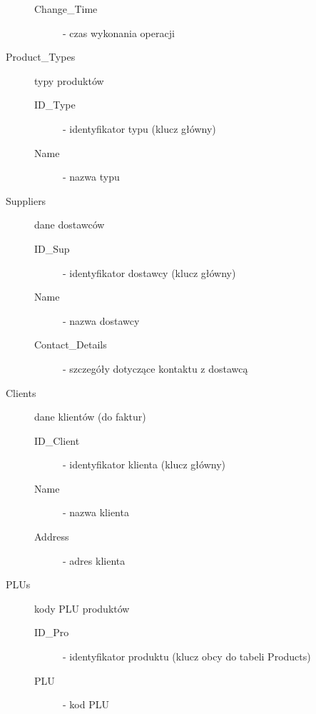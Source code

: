 \begin{description}
\begin{description}
    \item[Change\_Time] - czas wykonania operacji
    \end{description}
\item[Product\_Types] typy produktów
    \begin{description}
    \item[ID\_Type] - identyfikator typu (klucz główny)
    \item[Name] - nazwa typu
    \end{description}
\item[Suppliers] dane dostawców
    \begin{description}
    \item[ID\_Sup] - identyfikator dostawcy (klucz główny)
    \item[Name] - nazwa dostawcy
    \item[Contact\_Details] - szczegóły dotyczące kontaktu z dostawcą
    \end{description}
\item[Clients] dane klientów (do faktur)
    \begin{description}
    \item[ID\_Client] - identyfikator klienta (klucz główny)
    \item[Name] - nazwa klienta
    \item[Address] - adres klienta
    \end{description}
\item[PLUs] kody PLU produktów
    \begin{description}
    \item[ID\_Pro] - identyfikator produktu (klucz obcy do tabeli Products)
    \item[PLU] - kod PLU
    \end{description}
\end{description}

